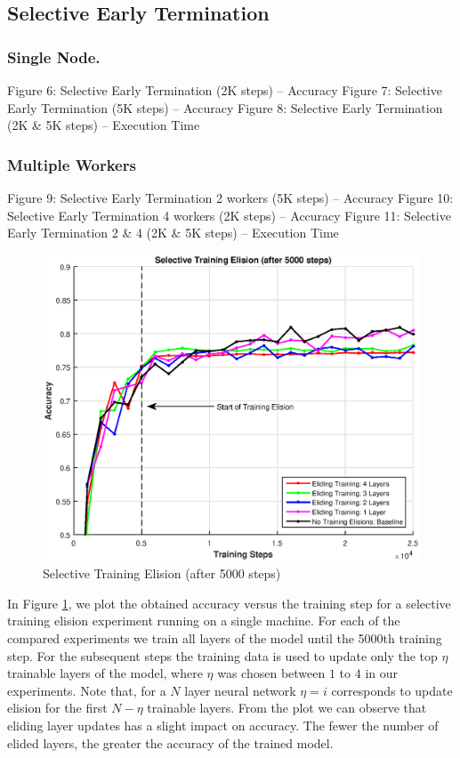 \subsection{Selective Early Termination}
\subsubsection{Single Node.} 
Figure 6: Selective Early Termination (2K steps) -- Accuracy
Figure 7: Selective Early Termination (5K steps) -- Accuracy
Figure 8: Selective Early Termination (2K \& 5K steps) -- Execution Time
\subsubsection{Multiple Workers}
Figure 9: Selective Early Termination 2 workers (5K steps) -- Accuracy 
Figure 10: Selective Early Termination 4 workers (2K steps) -- Accuracy
Figure 11: Selective Early Termination 2 \& 4 (2K \& 5K steps) -- Execution Time
\begin{figure}[t]
	\centering
	\includegraphics[width=0.8\columnwidth]{figures/approx.eps}
	\caption{Selective Training Elision (after 5000 steps)}
	\label{fig:approx}
\end{figure}

In Figure \ref{fig:approx}, we plot the obtained accuracy versus the training step for a selective training elision experiment running on a single machine. For each of the compared experiments we train all layers of the model until the 5000th training step. For the subsequent steps the training data is used to update only the top $\eta$ trainable layers of the model, where $\eta$ was chosen between $1$ to $4$ in our experiments. Note that, for a $N$ layer neural network $\eta=i$ corresponds to update elision for the first $N-\eta$ trainable layers. From the plot we can observe that eliding layer updates has a slight impact on accuracy. The fewer the number of elided layers, the greater the accuracy of the trained model. 

